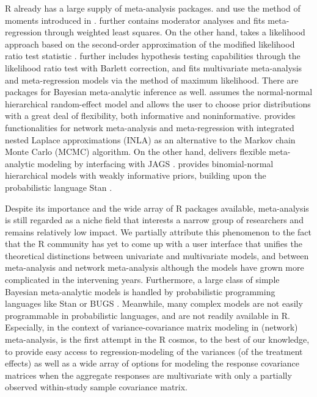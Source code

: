 R already has a large supply of meta-analysis packages.  \citep{meta2007} and  \citep{rmeta2018} use the method of moments
introduced in \citet{dersimonian1986meta}.  \citep{metafor2010} further contains moderator analyses and fits meta-regression \citep{berkey1995random}
through weighted least squares. On the other hand,  \citep{metaLik2012} takes a likelihood approach based on the second-order approximation of the
modified likelihood ratio test statistic \citep{skovgaard1996explicit}.  \citep{metatest2011} further includes hypothesis testing capabilities
through the likelihood ratio test with Barlett correction, and  \citep{mvmeta2012} fits multivariate meta-analysis and meta-regression models via the
method of maximum likelihood. There are packages for Bayesian meta-analytic inference as well.  \citep{bayesmeta2020} assumes the normal-normal hierarchical random-effect model
and allows the user to choose prior distributions with a great deal of flexibility, both informative and noninformative.  \citep{nmaINLA2018} provides
functionalities for network meta-analysis and meta-regression with integrated nested Laplace approximations (INLA) as an alternative to the Markov chain
Monte Carlo (MCMC) algorithm. On the other hand,  \citep{bmeta2016} delivers flexible meta-analytic modeling by interfacing with JAGS
\citep{Plummer03jags:a}. {\color{black} \citep{MetaStan2020} provides binomial-normal hierarchical models with weakly informative priors, building upon the probabilistic language Stan \citep{RStan2020}.}

Despite its importance and the wide array of R packages available, meta-analysis is still regarded as a niche field that interests a narrow group of researchers and remains relatively low impact. We partially attribute this phenomenon to the fact that the R community has yet to come up with a user interface that unifies the theoretical distinctions between univariate and multivariate models, and between meta-analysis and network meta-analysis although the models have grown more complicated in the intervening years. Furthermore, a large class of simple Bayesian meta-analytic models is handled by probabilistic programming languages like Stan \citep{RStan2020} or BUGS \citep{R2OpenBUGS}. Meanwhile, many complex models are not easily programmable in probabilistic languages, and are not readily available in R. Especially, in the context of variance-covariance matrix modeling in (network) meta-analysis,  is the first attempt in the R cosmos, to the best of our knowledge, to provide easy access to regression-modeling of the variances (of the treatment effects) as well as a wide array of options for modeling the response covariance matrices when the aggregate responses are multivariate with only a partially observed within-study sample covariance matrix.

